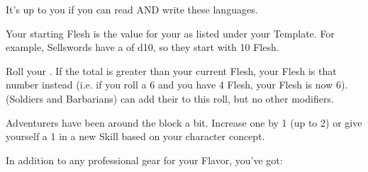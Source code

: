 {It's up to you if you can read AND write these languages.



Your starting Flesh is the \MAX value for your \HD as listed under your Template.  For example, Sellswords have a \HD of d10, so they start with 10 Flesh.  

Roll your \VIG.  If the total is greater than your current Flesh, your Flesh is that number instead (i.e. if you roll a 6 and you have 4 Flesh, your Flesh is now 6).  (Soldiers and Barbarians) can add their \LVL to this roll, but no other modifiers.


Adventurers have been around the block a bit.  Increase one  by 1 (up to 2) or give yourself a 1 in a new Skill based on your character concept.


In addition to any professional gear for your Flavor, you've got:


} %